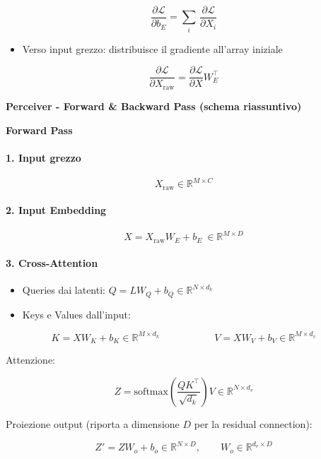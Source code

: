\documentclass[
  11pt,
]{article}
\begin{document}
\[\frac{\partial\mathcal{L}}{\partial b_{E}} = \sum_{i}^{}\,\frac{\partial\mathcal{L}}{\partial X_{i}}\]

\begin{itemize}
\item
  Verso input grezzo: distribuisce il gradiente
  all'array iniziale
\end{itemize}

\[\frac{\partial\mathcal{L}}{\partial X_{\text{raw}}} = \frac{\partial\mathcal{L}}{\partial X}W_{E}^{\top}\]

\textbf{Perceiver - Forward \& Backward Pass (schema riassuntivo)}

\textbf{Forward Pass}

\paragraph{1. \textbf{Input grezzo}}

\[X_{\text{raw}} \in \mathbb{R}^{M \times C}\]

\paragraph{2. \textbf{Input Embedding}}

\[X = X_{\text{raw}}W_{E} + b_{E}\  \in \mathbb{R}^{M \times D}\]

\paragraph{3. \textbf{Cross-Attention}}

\begin{itemize}
\item
  Queries dai latenti:
  \(Q = LW_{Q} + b_{Q} \in \mathbb{R}^{N \times d_k}\)
\item
  Keys e Values dall'input:
\end{itemize}


\[K = XW_{K} + b_{K} \in \mathbb{R}^{M \times d_k}\ \ \ \ \ \ \ \ \ \ \ \ \ \ \ \ \ \ \ \ \ \ \ \ \ V = XW_{V} + b_{V} \in \mathbb{R}^{M \times d_v}\]


Attenzione:


\[Z = \text{softmax}\!\left( \frac{QK^{\top}}{\sqrt{d_{k}}} \right)V \in \mathbb{R}^{N \times d_v}\]


Proiezione output (riporta a dimensione $D$ per la residual connection):

\[Z' = ZW_{o} + b_{o} \in \mathbb{R}^{N \times D}, \qquad W_o \in \mathbb{R}^{d_v \times D}\]
\end{document}
